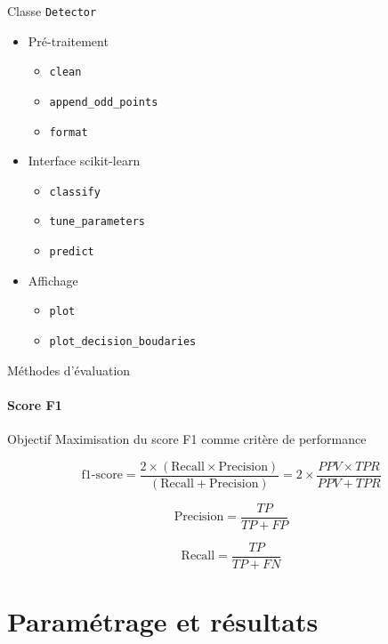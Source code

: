 \documentclass[usenames,dvipsnames]{beamer}
\begin{document}
\begin{frame}{Classe \texttt{Detector}}
\begin{itemize}
\item Pré-traitement \begin{itemize}
\item \texttt{clean}
\item \texttt{append\_odd\_points}
\item \texttt{format}
\end{itemize}
\item Interface scikit-learn \begin{itemize}
\item \texttt{classify}
\item \texttt{tune\_parameters}
\item \texttt{predict}
\end{itemize}
\item Affichage \begin{itemize}
\item \texttt{plot}
\item  \texttt{plot\_decision\_boudaries}
\end{itemize}
\end{itemize}
\end{frame}

\begin{frame}{Méthodes d'évaluation}
\framesubtitle{Score F1}

\begin{block}{Objectif}
Maximisation du score F1 comme critère de performance
\end{block}

\begin{equation}
\text{f1-score} = \dfrac{2\times(\text{Recall} \times \text{Precision})}{(\text{Recall} + \text{Precision})} = 2\times\dfrac{PPV \times TPR}{PPV + TPR}
\end{equation}

\begin{equation}
\text{Precision} = \dfrac{TP}{TP+FP}
\end{equation}

\begin{equation}
\text{Recall} = \dfrac{TP}{TP+FN}
\end{equation}

\end{frame}

\section{Paramétrage et résultats}
\end{document}
